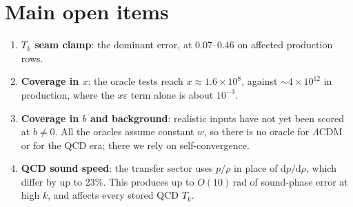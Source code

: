 \documentclass[11pt,a4paper]{article}
\begin{document}
\section{Main open items}
\begin{enumerate}
\item \textbf{$T_k$ seam clamp}: the dominant error, at $0.07$--$0.46$ on affected production
  rows.
\item \textbf{Coverage in $x$}: the oracle tests reach $x\approx1.6\times10^8$, against
  $\sim4\times10^{12}$ in production, where the $x\varepsilon$ term alone is about $10^{-3}$.
\item \textbf{Coverage in $b$ and background}: realistic inputs have not yet been scored at
  $b\neq0$. All the oracles assume constant $w$, so there is no oracle for $\Lambda$CDM or for
  the QCD era; there we rely on self-convergence.
\item \textbf{QCD sound speed}: the transfer sector uses $p/\rho$ in place of
  $\mathrm{d}p/\mathrm{d}\rho$, which differ by up to 23\%. This produces up to $O(10)$\,rad of
  sound-phase error at high $k$, and affects every stored QCD $T_k$.
\end{enumerate}
\end{document}
